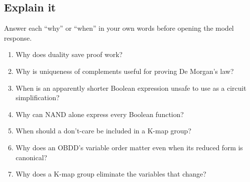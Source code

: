 \documentclass[11pt]{article}
\begin{document}
\begin{keepsection}
\section{Explain it}

Answer each “why” or “when” in your own words before opening the model response.

\begin{enumerate}
\item Why does duality save proof work?
\item Why is uniqueness of complements useful for proving De Morgan’s law?
\item When is an apparently shorter Boolean expression unsafe to use as a circuit simplification?
\item Why can NAND alone express every Boolean function?
\item When should a don’t-care be included in a K-map group?
\item Why does an OBDD’s variable order matter even when its reduced form is canonical?
\item Why does a K-map group eliminate the variables that change?
\end{enumerate}

\end{keepsection}

\clearpage
\end{document}
